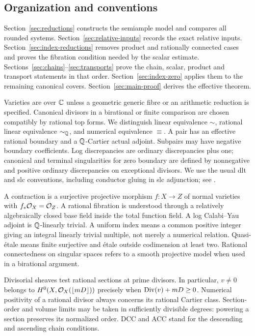 \subsection{Organization and conventions}

Section~\ref{sec:reductions} constructs the semiample model and compares
all rounded systems. Section~\ref{sec:relative-inputs} records the exact
relative inputs. Section~\ref{sec:index-reductions} removes product and
rationally connected cases and proves the fibration condition needed by
the scalar estimate. Sections~\ref{sec:chains}--\ref{sec:transports}
prove the chain, scalar, product and transport statements in that order.
Section~\ref{sec:index-zero} applies them to the remaining canonical
covers. Section~\ref{sec:main-proof} derives the effective theorem.

Varieties are over $\mathbb C$ unless a geometric generic fibre or an
arithmetic reduction is specified. Canonical divisors in a
birational or finite comparison are chosen compatibly by rational
top forms. We distinguish linear equivalence $\sim$, rational
linear equivalence $\sim_{\mathbb Q}$, and numerical equivalence
$\equiv$. A pair has an effective rational boundary and a
\(\mathbb Q\)-Cartier actual adjoint. Subpairs may have negative boundary
coefficients. Log discrepancies are ordinary discrepancies plus
one; canonical and terminal singularities for zero boundary are
defined by nonnegative and positive ordinary discrepancies on
exceptional divisors. We use the usual dlt and slc conventions,
including conductor gluing in slc adjunction; see \cite{Kollar2013}.

A contraction is a surjective projective morphism $f:X\to Z$ of
normal varieties with $f_*\mathcal O_X=\mathcal O_Z$. A rational fibration is
understood through a relatively algebraically closed base field
inside the total function field. A log Calabi--Yau adjoint is
\(\mathbb Q\)-linearly trivial. A uniform index means a common positive
integer giving an integral linearly trivial multiple, not merely
a numerical relation. Quasi-\'{e}tale means finite surjective and
\'{e}tale outside codimension at least two. Rational connectedness
on singular spaces refers to a smooth projective model when used
in a birational argument.

Divisorial sheaves test rational sections at prime divisors. In
particular, $v\ne0$ belongs to
$H^0(X,\mathcal O_X(\lfloor mD\rfloor))$ precisely when
$\operatorname{Div}(v)+mD\geq0$. Numerical positivity of a rational divisor
always concerns its rational Cartier class. Section-order and
volume limits may be taken in sufficiently divisible degrees:
powering a section preserves its normalized order. DCC and ACC
stand for the descending and ascending chain conditions.

